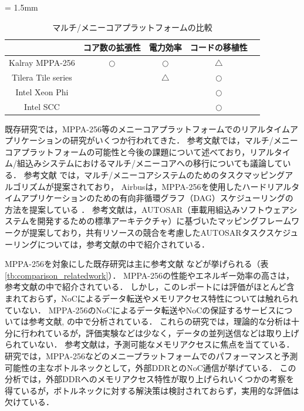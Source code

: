 \documentclass[submit,techrep]{ipsj_v2/UTF8/ipsj}
\begin{document}
\begin{table}[t]
  \caption{\label{tb:comparison_manycore}
    マルチ/メニーコアプラットフォームの比較}
  \centering
  \scriptsize	                    %
  \tabcolsep = 1.5mm              %
  \begin{tabular}{c|cccc}
    \hline
    & コア数の拡張性 & 電力効率  & コードの移植性 & \\
    \hline
    \hline
    Kalray MPPA-256 \cite{de2014time} & \(\bigcirc\) & \(\bigcirc\) & \(\triangle\) & \\
    Tilera Tile series \cite{bell2008tile64} &  & \(\triangle\) & \(\bigcirc\) & \\
    Intel Xeon Phi \cite{chrysos2014intel} \cite{chrysos2012intel} &  &  & \(\bigcirc\) & \\
    Intel SCC \cite{baron2010single} &  &  & \(\bigcirc\) & \\
    \hline
  \end{tabular}
\end{table}

既存研究では，MPPA-256等のメニーコアプラットフォームでのリアルタイムアプリケーションの研究がいくつか行われてきた．
参考文献\cite{saidi2015shift}では，マルチ/メニーコアプラットフォームの可能性と今後の課題について述べており，リアルタイム/組込みシステムにおけるマルチ/メニーコアへの移行についても議論している．
参考文献\cite{carle2014static} \cite{faragardi2014communication} \cite{perret2016mapping}では，マルチ/メニーコアシステムのためのタスクマッピングアルゴリズムが提案されており，
Airbusは，MPPA-256を使用したハードリアルタイムアプリケーションのための有向非循環グラフ（DAG）スケジューリングの方法を提案している \cite{perret2016mapping}．
参考文献\cite{faragardi2014communication}は，AUTOSAR（車載用組込みソフトウェアシステムを開発するための標準アーキテクチャ\cite{furst2009autosar}）に基づいたマッピングフレームワークが提案しており，共有リソースの競合を考慮したAUTOSARタスクスケジューリングについては，参考文献\cite{becker2016contention}の中で紹介されている．

MPPA-256を対象にした既存研究は主に参考文献\cite{deDinechin2014GSN} \cite{denet2017work} \cite{kanter2015kalray} \cite{perret2016predictable} などが挙げられる（表\ref{tb:comparison_relatedwork}）．
MPPA-256の性能やエネルギー効率の高さは，参考文献\cite{kanter2015kalray}の中で紹介されている．
しかし，このレポートには評価がほとんど含まれておらず，NoCによるデータ転送やメモリアクセス特性については触れられていない．
MPPA-256のNoCによるデータ転送やNoCの保証するサービスについては参考文献\cite{deDinechin2014GSN}, \cite{denet2017work}の中で分析されている．
これらの研究では，理論的な分析は十分に行われているが，評価実験などは少なく，データの並列送信などは取り上げられていない．
参考文献\cite{perret2016predictable}は，予測可能なメモリアクセスに焦点を当てている．
研究では，MPPA-256などのメニープラットフォームでのパフォーマンスと予測可能性の主なボトルネックとして，外部DDRとのNoC通信が挙げている．
この分析では，外部DDRへのメモリアクセス特性が取り上げられいくつかの考察を得ているが，ボトルネックに対する解決策は検討されておらず，実用的な評価は欠けている．
\end{document}
